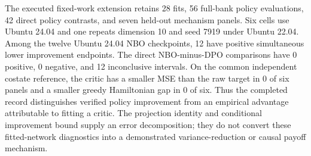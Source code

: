The executed fixed-work extension retains 28 fits, 56 full-bank policy evaluations, 42 direct policy contrasts, and seven held-out mechanism panels. Six cells use Ubuntu 24.04 and one repeats dimension 10 and seed 7919 under Ubuntu 22.04. Among the twelve Ubuntu 24.04 NBO checkpoints, 12 have positive simultaneous lower improvement endpoints. The direct NBO-minus-DPO comparisons have 0 positive, 0 negative, and 12 inconclusive intervals. On the common independent costate reference, the critic has a smaller MSE than the raw target in 0 of six panels and a smaller greedy Hamiltonian gap in 0 of six. Thus the completed record distinguishes verified policy improvement from an empirical advantage attributable to fitting a critic. The projection identity and conditional improvement bound supply an error decomposition; they do not convert these fitted-network diagnostics into a demonstrated variance-reduction or causal payoff mechanism.
